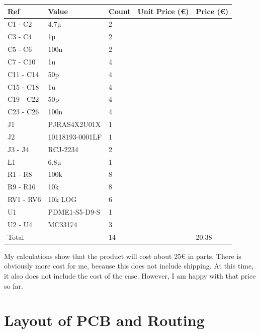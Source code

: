 \documentclass[a4paper]{article}
\begin{document}
\begin{center}
\begin{tabular}{@{}lllll@{}}
\toprule
Ref & Value & Count & Unit Price (€) & Price (€)\\
\midrule
C1 - C2 & 4.7µ & 2 \\
C3 - C4 & 1µ  & 2\\
C5 - C6 & 100n & 2\\
C7 - C10 & 1u & 4\\
C11 - C14 & 50p & 4\\
C15 - C18 & 1u & 4\\
C19 - C22 & 50p & 4\\
C23 - C26 & 100n & 4\\
J1 & PJRAS4X2U01X & 1\\
J2 & 10118193-0001LF & 1\\
J3 - J4 & RCJ-2234 & 2\\
L1 & 6.8µ & 1\\
R1 - R8 & 100k & 8\\
R9 - R16 & 10k & 8\\
RV1 - RV6 & 10k LOG & 6\\
U1 & PDME1-S5-D9-S & 1\\
U2 - U4 & MC33174 & 3\\

\midrule
Total & & 14 && 20.38\\
\bottomrule
\end{tabular}
\end{center}

My calculations show that the product will cost about 25€ in parts. There is obviously more cost for me, because this does not include shipping. At this time, it also does not include the cost of the case. However, I am happy with that price so far. 

\section{Layout of PCB and Routing}
\end{document}
